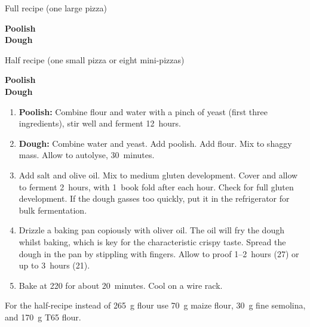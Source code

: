 
\begin{minipage}{.45\textwidth}
  Full recipe (one large pizza)
  
  \begin{ingredients}
    \textbf{Poolish}\\
    \textbf{Dough}\\
  \end{ingredients}
\end{minipage}
\begin{minipage}{.45\textwidth}
  Half recipe (one small pizza or eight mini-pizzas)
  
  \begin{ingredients}
    \textbf{Poolish}\\
    \textbf{Dough}\\
  \end{ingredients}
\end{minipage}

\begin{recipe}
  \begin{enumerate}

  \item \textbf{Poolish:} Combine flour and water with a pinch of
    yeast (first three ingredients), stir well and ferment 12~hours.
    
  \item \textbf{Dough:} Combine water and yeast.  Add poolish.  Add
    flour.  Mix to shaggy mass.  Allow to autolyse, 30~minutes.
    
  \item Add salt and olive oil.  Mix to medium gluten development.
    Cover and allow to ferment 2\fracH~hours, with 1~book fold after
    each hour.  Check for full gluten development.  If the dough
    gasses too quickly, put it in the refrigerator for bulk fermentation.
    
  \item Drizzle a baking pan copiously with oliver oil.  The oil will
    fry the dough whilst baking, which is key for the characteristic
    crispy taste.  Spread the dough in the pan by stippling with
    fingers.  Allow to proof 1\fracH--2~hours (27\degreeC) or up to
    3~hours (21\degreeC).
    
  \item Bake at 220\degreeC{} for about 20~minutes.  Cool on a wire rack.

  \end{enumerate}
\end{recipe}


For the half-recipe instead of 265~g flour use 70~g maize flour, 30~g
fine semolina, and 170~g T65 flour.

